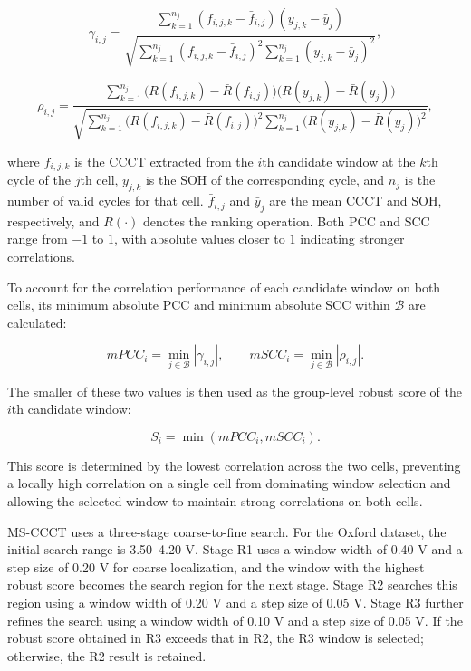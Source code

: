 \begin{equation}
\gamma_{i,j}=
\frac{\displaystyle\sum_{k=1}^{n_j}(f_{i,j,k}-\bar{f}_{i,j})(y_{j,k}-\bar{y}_j)}
     {\displaystyle\sqrt{\sum_{k=1}^{n_j}(f_{i,j,k}-\bar{f}_{i,j})^2\sum_{k=1}^{n_j}(y_{j,k}-\bar{y}_j)^2}},
\end{equation}

\begin{equation}
\rho_{i,j}=
\frac{\displaystyle\sum_{k=1}^{n_j}\bigl(R(f_{i,j,k})-\bar{R}(f_{i,j})\bigr)\bigl(R(y_{j,k})-\bar{R}(y_j)\bigr)}
{\displaystyle\sqrt{\sum_{k=1}^{n_j}\bigl(R(f_{i,j,k})-\bar{R}(f_{i,j})\bigr)^2\sum_{k=1}^{n_j}\bigl(R(y_{j,k})-\bar{R}(y_j)\bigr)^2}},
\end{equation}

where $f_{i,j,k}$ is the CCCT extracted from the $i$th candidate window at the $k$th cycle of the $j$th cell, $y_{j,k}$ is the SOH of the corresponding cycle, and $n_j$ is the number of valid cycles for that cell. $\bar{f}_{i,j}$ and $\bar{y}_j$ are the mean CCCT and SOH, respectively, and $R(\cdot)$ denotes the ranking operation. Both PCC and SCC range from $-1$ to $1$, with absolute values closer to $1$ indicating stronger correlations.

To account for the correlation performance of each candidate window on both cells, its minimum absolute PCC and minimum absolute SCC within $\mathcal{B}$ are calculated:

\begin{equation*}
mPCC_i=\min_{j\in\mathcal{B}}|\gamma_{i,j}|,\qquad
mSCC_i=\min_{j\in\mathcal{B}}|\rho_{i,j}|.
\end{equation*}

The smaller of these two values is then used as the group-level robust score of the $i$th candidate window:

\begin{equation}
S_i=\min(mPCC_i,mSCC_i).
\end{equation}

This score is determined by the lowest correlation across the two cells, preventing a locally high correlation on a single cell from dominating window selection and allowing the selected window to maintain strong correlations on both cells.

MS-CCCT uses a three-stage coarse-to-fine search. For the Oxford dataset, the initial search range is 3.50--4.20 V. Stage R1 uses a window width of 0.40 V and a step size of 0.20 V for coarse localization, and the window with the highest robust score becomes the search region for the next stage. Stage R2 searches this region using a window width of 0.20 V and a step size of 0.05 V. Stage R3 further refines the search using a window width of 0.10 V and a step size of 0.05 V. If the robust score obtained in R3 exceeds that in R2, the R3 window is selected; otherwise, the R2 result is retained.

